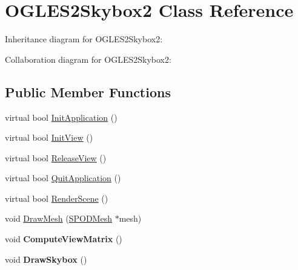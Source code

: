 \hypertarget{class_o_g_l_e_s2_skybox2}{\section{O\+G\+L\+E\+S2\+Skybox2 Class Reference}
\label{class_o_g_l_e_s2_skybox2}
}


Inheritance diagram for O\+G\+L\+E\+S2\+Skybox2\+:


Collaboration diagram for O\+G\+L\+E\+S2\+Skybox2\+:
\subsection*{Public Member Functions}
\begin{DoxyCompactItemize}
\item 
virtual bool \hyperlink{class_o_g_l_e_s2_skybox2_a2bbdcb0db9271339c79af519ee4c4732}{Init\+Application} ()
\item 
virtual bool \hyperlink{class_o_g_l_e_s2_skybox2_ada3a5fbf77319ed17e7b2f50068d3a8f}{Init\+View} ()
\item 
virtual bool \hyperlink{class_o_g_l_e_s2_skybox2_a19a1dc336e9dffe91c504a3ce17cdede}{Release\+View} ()
\item 
virtual bool \hyperlink{class_o_g_l_e_s2_skybox2_aea8b89eba81f0d947289340b45fd5187}{Quit\+Application} ()
\item 
virtual bool \hyperlink{class_o_g_l_e_s2_skybox2_a83cd337e5f97f8c739d25513a20a26d1}{Render\+Scene} ()
\item 
void \hyperlink{class_o_g_l_e_s2_skybox2_a7ba90985d7d84fe3c8278ceecb52ee61}{Draw\+Mesh} (\hyperlink{struct_s_p_o_d_mesh}{S\+P\+O\+D\+Mesh} $\ast$mesh)
\item 
\hypertarget{class_o_g_l_e_s2_skybox2_a042df7207a3e75bb7194b55e760688be}{void {\bfseries Compute\+View\+Matrix} ()}\label{class_o_g_l_e_s2_skybox2_a042df7207a3e75bb7194b55e760688be}

\item 
\hypertarget{class_o_g_l_e_s2_skybox2_aa01e8fc906f0bd097eb5d96a333b3ca4}{void {\bfseries Draw\+Skybox} ()}\label{class_o_g_l_e_s2_skybox2_aa01e8fc906f0bd097eb5d96a333b3ca4}


\end{DoxyCompactItemize}
